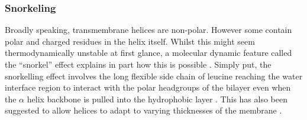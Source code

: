
\subsubsection{Snorkeling}

Broadly speaking, transmembrane helices are non-polar. However some contain polar and  charged residues in the helix itself. Whilst this might seem thermodynamically unstable at first glance, a molecular dynamic feature called the ``snorkel'' effect explains in part how this is possible \cite{Chamberlain2004, Strandberg2003}. Simply put, the snorkelling effect involves the long flexible side chain of leucine reaching the water interface region to interact with the polar headgroups of the bilayer even when the $\alpha$ helix backbone is pulled into the hydrophobic layer \cite{Krishnakumar2007}. This has also been suggested to allow helices to adapt to varying thicknesses of the membrane \cite{Kandasamy2006}.

